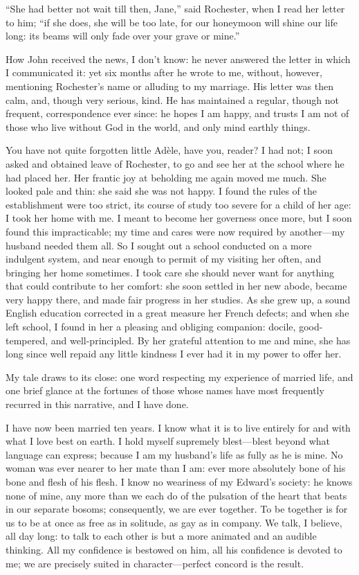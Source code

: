 \enquote{She had better not wait till then, Jane,} said \Mr{} Rochester,
when I read her letter to him; \enquote{if she does, she will be too
late, for our honeymoon will shine our life long: its beams will only
fade over your grave or mine.}

How \St{} John received the news, I don't know: he never answered the
letter in which I communicated it: yet six months after he wrote to me,
without, however, mentioning \Mr{} Rochester's name or alluding to my
marriage. His letter was then calm, and, though very serious, kind. He
has maintained a regular, though not frequent, correspondence ever
since: he hopes I am happy, and trusts I am not of those who live
without God in the world, and only mind earthly things.

You have not quite forgotten little Adèle, have you, reader? I had not;
I soon asked and obtained leave of \Mr{} Rochester, to go and see her at
the school where he had placed her. Her frantic joy at beholding me
again moved me much. She looked pale and thin: she said she was not
happy. I found the rules of the establishment were too strict, its
course of study too severe for a child of her age: I took her home with
me. I meant to become her governess once more, but I soon found this
impracticable; my time and cares were now required by another---my
husband needed them all. So I sought out a school conducted on a more
indulgent system, and near enough to permit of my visiting her often,
and bringing her home sometimes. I took care she should never want for
anything that could contribute to her comfort: she soon settled in her
new abode, became very happy there, and made fair progress in her
studies. As she grew up, a sound English education corrected in a great
measure her French defects; and when she left school, I found in her a
pleasing and obliging companion: docile, good-tempered, and
well-principled. By her grateful attention to me and mine, she has long
since well repaid any little kindness I ever had it in my power to offer
her.

My tale draws to its close: one word respecting my experience of married
life, and one brief glance at the fortunes of those whose names have
most frequently recurred in this narrative, and I have done.

I have now been married ten years. I know what it is to live entirely
for and with what I love best on earth. I hold myself supremely
blest---blest beyond what language can express; because I am my
husband's life as fully as he is mine. No woman was ever nearer to her
mate than I am: ever more absolutely bone of his bone and flesh of his
flesh. I know no weariness of my Edward's society: he knows none of
mine, any more than we each do of the pulsation of the heart that beats
in our separate bosoms; consequently, we are ever together. To be
together is for us to be at once as free as in solitude, as gay as in
company. We talk, I believe, all day long: to talk to each other is but
a more animated and an audible thinking. All my confidence is bestowed
on him, all his confidence is devoted to me; we are precisely suited in
character---perfect concord is the result.

